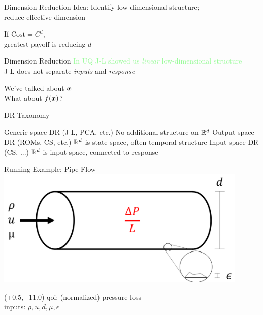 \documentclass[14pt]{beamer}
\begin{document}

\begin{frame}{Dimension Reduction}
  Idea: Identify low-dimensional structure; \\
  reduce effective dimension

  \bigskip If $\text{Cost} = C^d$, \\
  greatest payoff is reducing $d$
\end{frame}

\begin{frame}{Dimension Reduction \textcolor{palegreen}{In UQ}}
  \bigskip \textcolor{palegreen}{J-L showed us \emph{linear} low-dimensional structure} \\
  \textcolor{palered}{J-L does not separate \emph{inputs} and \emph{response}}

  \bigskip We've talked about $\boldsymbol{x}$ \\
  What about $f(\boldsymbol{x})$?
\end{frame}

\begin{frame}{DR Taxonomy}
  \begin{outline}
  \1 Generic-space DR (J-L, PCA, etc.)
    \2 No additional structure on $\mathbb{R}^{d}$
  \1 Output-space DR (ROMs, CS, etc.)
    \2 $\mathbb{R}^{d}$ is state space, often temporal structure
  \1 \alert<2>{Input-space DR} (CS, ...)
    \2 $\mathbb{R}^{d}$ is input space, connected to response
  \end{outline}
\end{frame}

\begin{frame}{Running Example: Pipe Flow}
  \centering
  \includegraphics[width=0.9\textwidth]{../../images/pipe_diagram}

  \begin{textblock}{6.0}(+0.5,+11.0)
      {\textblockcolor{}
        qoi: (normalized) pressure loss \\
        inputs: $\rho, u, d, \mu, \epsilon$
      }
  \end{textblock}
\end{frame}
\end{document}
